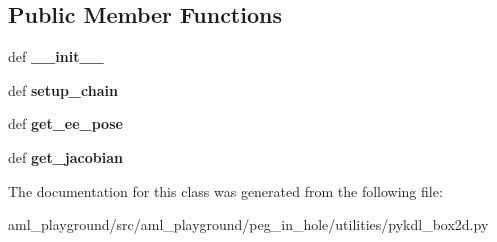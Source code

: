 \subsection*{Public Member Functions}
\begin{DoxyCompactItemize}
\item 
\hypertarget{classaml__playground_1_1peg__in__hole_1_1utilities_1_1pykdl__box2d_1_1_py_k_d_l_box2d_a78d5da56b7249d65fccb7953e83add16}{def {\bfseries \-\_\-\-\_\-init\-\_\-\-\_\-}}\label{classaml__playground_1_1peg__in__hole_1_1utilities_1_1pykdl__box2d_1_1_py_k_d_l_box2d_a78d5da56b7249d65fccb7953e83add16}

\item 
\hypertarget{classaml__playground_1_1peg__in__hole_1_1utilities_1_1pykdl__box2d_1_1_py_k_d_l_box2d_a68c0f76c4da54a20bc2c33f04f8a3185}{def {\bfseries setup\-\_\-chain}}\label{classaml__playground_1_1peg__in__hole_1_1utilities_1_1pykdl__box2d_1_1_py_k_d_l_box2d_a68c0f76c4da54a20bc2c33f04f8a3185}

\item 
\hypertarget{classaml__playground_1_1peg__in__hole_1_1utilities_1_1pykdl__box2d_1_1_py_k_d_l_box2d_a3e7acd42a1a422f18a4d82709ab145c4}{def {\bfseries get\-\_\-ee\-\_\-pose}}\label{classaml__playground_1_1peg__in__hole_1_1utilities_1_1pykdl__box2d_1_1_py_k_d_l_box2d_a3e7acd42a1a422f18a4d82709ab145c4}

\item 
\hypertarget{classaml__playground_1_1peg__in__hole_1_1utilities_1_1pykdl__box2d_1_1_py_k_d_l_box2d_aabefbe50205430c2aa73e14587881e91}{def {\bfseries get\-\_\-jacobian}}\label{classaml__playground_1_1peg__in__hole_1_1utilities_1_1pykdl__box2d_1_1_py_k_d_l_box2d_aabefbe50205430c2aa73e14587881e91}

\end{DoxyCompactItemize}


The documentation for this class was generated from the following file\-:\begin{DoxyCompactItemize}
\item 
aml\-\_\-playground/src/aml\-\_\-playground/peg\-\_\-in\-\_\-hole/utilities/pykdl\-\_\-box2d.\-py\end{DoxyCompactItemize}
